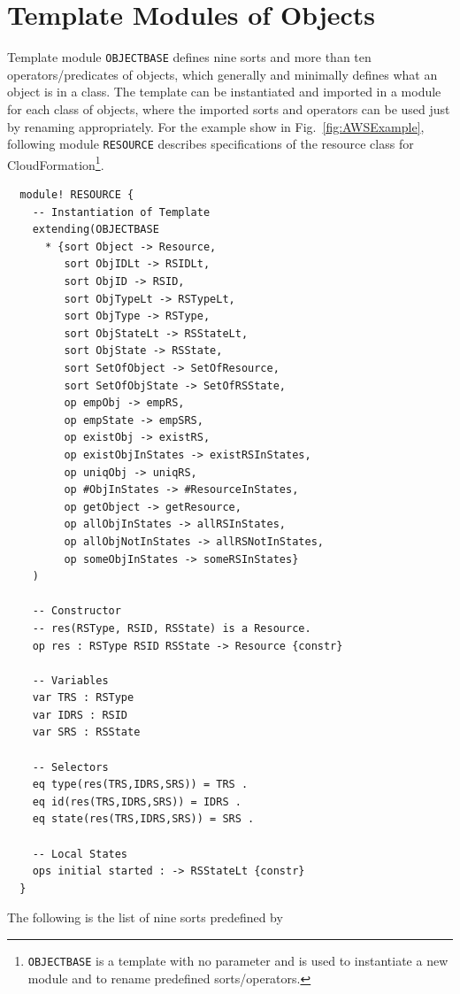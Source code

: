 \documentclass[12pt]{report}
\begin{document}
\section{Template Modules of Objects}
\label{sec:objectbase}
Template module {\tt OBJECTBASE} defines nine sorts and more than ten
operators/predicates of objects, which generally and minimally defines
what an object is in a class. The template can be instantiated and
imported in a module for each class of objects, where the imported
sorts and operators can be used just by renaming appropriately. For
the example show in Fig.~\ref{fig:AWSExample}, following module
{\tt RESOURCE} describes specifications of the resource class for
CloudFormation\footnote{{\tt OBJECTBASE} is a template with no
  parameter and is used to instantiate a new module and to rename
  predefined sorts/operators.}.
\small
\begin{verbatim}
  module! RESOURCE {
    -- Instantiation of Template
    extending(OBJECTBASE
      * {sort Object -> Resource,
         sort ObjIDLt -> RSIDLt,
         sort ObjID -> RSID,
         sort ObjTypeLt -> RSTypeLt,
         sort ObjType -> RSType,
         sort ObjStateLt -> RSStateLt,
         sort ObjState -> RSState,
         sort SetOfObject -> SetOfResource,
         sort SetOfObjState -> SetOfRSState,
         op empObj -> empRS,
         op empState -> empSRS,
         op existObj -> existRS,
         op existObjInStates -> existRSInStates,
         op uniqObj -> uniqRS,
         op #ObjInStates -> #ResourceInStates,
         op getObject -> getResource,
         op allObjInStates -> allRSInStates,
         op allObjNotInStates -> allRSNotInStates,
         op someObjInStates -> someRSInStates}
    )
  
    -- Constructor
    -- res(RSType, RSID, RSState) is a Resource.
    op res : RSType RSID RSState -> Resource {constr}
  
    -- Variables
    var TRS : RSType
    var IDRS : RSID
    var SRS : RSState
  
    -- Selectors
    eq type(res(TRS,IDRS,SRS)) = TRS .
    eq id(res(TRS,IDRS,SRS)) = IDRS .
    eq state(res(TRS,IDRS,SRS)) = SRS .
  
    -- Local States
    ops initial started : -> RSStateLt {constr}
  }
\end{verbatim}
\normalsize
The following is the list of nine sorts predefined by
\end{document}
